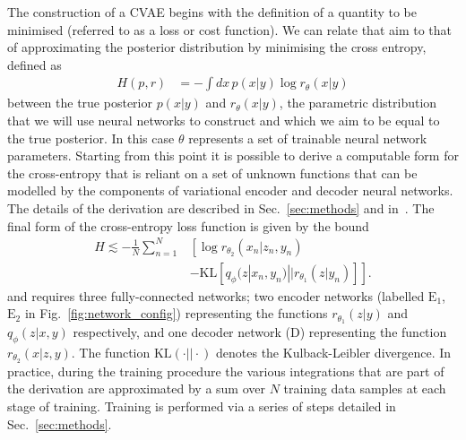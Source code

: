 \documentclass[%
showpacs,
 amsmath,amssymb,
 aps,
 twocolumn,
 prl,
 reprint,
floatfix,
]{revtex4-1}
\begin{document}
%
%
The construction of a \ac{CVAE} begins with the definition of a quantity to be
minimised (referred to as a loss or cost function). We can relate that aim to
that of approximating the posterior distribution by minimising the cross
entropy, defined as
%
\begin{align}\label{eq:cross_ent} 
H(p,r) &= -\int dx\, p(x|y) \log r_{\theta}(x|y) 
\end{align}
%
between the true posterior $p(x|y)$ and $r_{\theta}(x|y)$, the parametric
distribution that we will use neural networks to construct and which we aim to
be equal to the true posterior. In this case $\theta$ represents a set of
trainable neural network parameters. Starting from this point it is possible to
derive a computable form for the cross-entropy that is reliant on a set of
unknown functions that can be modelled by the components of variational encoder
and decoder neural networks. The details of the derivation are described in
Sec.~\ref{sec:methods} and in~\cite{1904.06264}. The final form of the
cross-entropy loss function is given by the bound
%
\begin{align}\label{eq:cost3}
H \lesssim -\frac{1}{N}\sum_{n=1}^{N}&\left[\log
r_{\theta_{2}}(x_{n}|z_{n},y_{n})\right.\nonumber\\
&\left.-\text{KL}\left[q_{\phi}(z|x_{n},y_{n})||r_{\theta_{1}}(z|y_{n})\right]\right].
\end{align}
%
and requires three fully-connected networks; two encoder networks (labelled
$\textrm{E}_1$, $\textrm{E}_2$ in Fig.~\ref{fig:network_config}) representing
the functions $r_{\theta_{1}}(z|y)$ and $q_{\phi}(z|x,y)$ respectively, and one
decoder network (D) representing the function $r_{\theta_{2}}(x|z,y)$. The
function $\text{KL}(\cdot||\cdot)$ denotes the Kulback-Leibler divergence. In
practice, during the training procedure the various integrations that are part
of the derivation are approximated by a sum over $N$ training data samples at
each stage of training. Training is performed via a series of steps detailed in
Sec.~\ref{sec:methods}.
\end{document}
